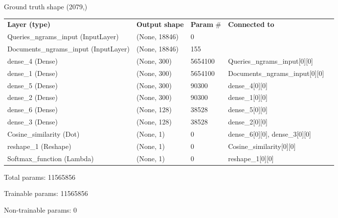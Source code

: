 Ground truth shape (2079,)

\begin{table}[H]
\begin{tabular}{p{3.2cm}llll}
\textbf{Layer (type)} & \textbf{Output shape} & \textbf{Param} \# & \textbf{Connected to} & \\
Queries\_ngrams\_input (InputLayer) & (None, 18846) & 0 &  & \\
Documents\_ngrams\_input (InputLayer) & (None, 18846) & 155 &  & \\
dense\_4 (Dense) & (None, 300) & 5654100 & Queries\_ngrams\_input[0][0] & \\
dense\_1 (Dense) & (None, 300) & 5654100 & Documents\_ngrams\_input[0][0] & \\
dense\_5 (Dense) & (None, 300) & 90300 & dense\_4[0][0] & \\
dense\_2 (Dense) & (None, 300) & 90300 & dense\_1[0][0] & \\
dense\_6 (Dense) & (None, 128) & 38528 & dense\_5[0][0] & \\
dense\_3 (Dense) & (None, 128) & 38528 & dense\_2[0][0] & \\
Cosine\_similarity (Dot) & (None, 1) & 0 & dense\_6[0][0], dense\_3[0][0] & \\
reshape\_1 (Reshape) & (None, 1) & 0 & Cosine\_similarity[0][0] & \\
Softmax\_function (Lambda) & (None, 1) & 0 & reshape\_1[0][0] & \\
\end{tabular}
\end{table}

Total params: 11565856

Trainable params: 11565856

Non-trainable params: 0
